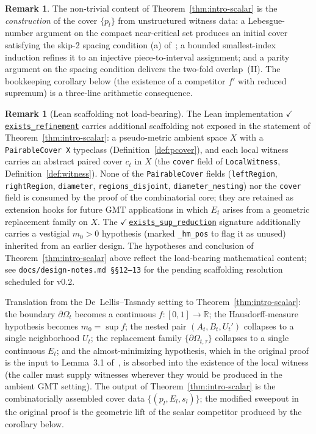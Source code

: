 \documentclass[11pt,reqno]{amsart}
\theoremstyle{definition}
\newtheorem{remark}[theorem]{Remark}
\newcommand{\leanrepo}{https://github.com/MathNetwork/comb_arg/blob/v0.1.0/CombArg}
\newcommand{\lean}[2]{{\normalfont\color{leangreen}%
  \ensuremath{\checkmark}\,\href{\leanrepo/#2}{\texttt{#1}}}}
\begin{document}
\begin{remark}
\label{rem:intro-core-nontrivial}
The non-trivial content of Theorem~\ref{thm:intro-scalar} is the
\emph{construction} of the cover $\{p_l\}$ from unstructured
witness data: a Lebesgue-number argument on the compact
near-critical set produces an initial cover satisfying the
skip-2 spacing condition (a) of~\cite{DLT13}; a bounded
smallest-index induction refines it to an injective
piece-to-interval assignment; and a parity argument on the
spacing condition delivers the two-fold overlap~(II). The
bookkeeping corollary below (the existence of a competitor $f'$
with reduced supremum) is a three-line arithmetic consequence.
\end{remark}

\begin{remark}[Lean scaffolding not load-bearing]
\label{rem:lean-scaffolding}
The Lean implementation
\lean{exists\_refinement}{Refinement/Assembly.lean} carries
additional scaffolding not exposed in the statement of
Theorem~\ref{thm:intro-scalar}: a pseudo-metric ambient space
$X$ with a \texttt{PairableCover X} typeclass
(Definition~\ref{def:pcover}), and each local witness carries
an abstract paired cover $c_t$ in $X$ (the \texttt{cover} field
of \texttt{LocalWitness}, Definition~\ref{def:witness}). None of
the \texttt{PairableCover} fields
(\texttt{leftRegion}, \texttt{rightRegion}, \texttt{diameter},
\texttt{regions\_disjoint}, \texttt{diameter\_nesting}) nor the
\texttt{cover} field is consumed by the proof of the
combinatorial core; they are retained as extension hooks for
future GMT applications in which $E_t$ arises from a geometric
replacement family on $X$. The
\lean{exists\_sup\_reduction}{SupReduction.lean} signature
additionally carries a vestigial $m_0 > 0$ hypothesis (marked
\texttt{\_hm\_pos} to flag it as unused) inherited from an
earlier design. The hypotheses and conclusion of
Theorem~\ref{thm:intro-scalar} above reflect the load-bearing
mathematical content; see
\texttt{docs/design-notes.md~\S\S12--13} for the pending
scaffolding resolution scheduled for v0.2.
\end{remark}

Translation from the De~Lellis--Tasnady setting to
Theorem~\ref{thm:intro-scalar}: the boundary $\partial \Omega_t$
becomes a continuous $f : [0,1] \to \mathbb{R}$; the
Hausdorff-measure hypothesis becomes $m_0 = \sup f$; the nested
pair $(A_t, B_t, U_t')$ collapses to a single neighborhood $U_t$;
the replacement family $\{\partial \Omega_{t,\tau}\}$ collapses
to a single continuous $E_t$; and the almost-minimizing
hypothesis, which in the original proof is the input to
Lemma~3.1 of~\cite{DLT13}, is absorbed into the existence of the
local witness (the caller must supply witnesses wherever they
would be produced in the ambient GMT setting). The output of
Theorem~\ref{thm:intro-scalar} is the combinatorially assembled
cover data $\{(p_l, E_l, s_l)\}$; the modified sweepout in the
original proof is the geometric lift of the scalar competitor
produced by the corollary below.
\end{document}
